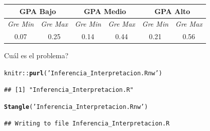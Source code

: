 \documentclass[onesided]{article}\usepackage[]{graphicx}\usepackage[]{color}
\makeatletter
\newcommand{\hlstr}[1]{\textcolor[rgb]{0.192,0.494,0.8}{#1}}%
\newcommand{\hlopt}[1]{\textcolor[rgb]{0,0,0}{#1}}%
\newcommand{\hlstd}[1]{\textcolor[rgb]{0.345,0.345,0.345}{#1}}%
\newcommand{\hlkwd}[1]{\textcolor[rgb]{0.737,0.353,0.396}{\textbf{#1}}}%
\newenvironment{kframe}{%
 \def\at@end@of@kframe{}%
 \ifinner\ifhmode%
  \def\at@end@of@kframe{\end{minipage}}%
  \begin{minipage}{\columnwidth}%
 \fi\fi%
 \def\FrameCommand##1{\hskip\@totalleftmargin \hskip-\fboxsep
 \colorbox{shadecolor}{##1}\hskip-\fboxsep
     \hskip-\linewidth \hskip-\@totalleftmargin \hskip\columnwidth}%
 \MakeFramed {\advance\hsize-\width
   \@totalleftmargin\z@ \linewidth\hsize
   \@setminipage}}%
 {\par\unskip\endMakeFramed%
 \at@end@of@kframe}
\newenvironment{knitrout}{}{} %
\makeatother
\begin{document}
\begin{table}[H]
\begin{tabular}{|c|c|c|c|c|c|}
\hline
\multicolumn{2}{|c|}{\textbf{GPA Bajo}} & \multicolumn{2}{c|}{\textbf{GPA Medio}} & \multicolumn{2}{c|}{\textbf{GPA Alto}} \\ \hline
\textit{Gre Min}   & \textit{Gre Max}   & \textit{Gre Min}   & \textit{Gre Max}   & \textit{Gre Min}   & \textit{Gre Max}  \\ \hline
0.07 & 0.25 &                    
0.14 & 0.44 &                    
0.21 & 0.56 \\ \hline
\end{tabular}
\end{table}


{\color{red}Cu\'al es el problema?}

\begin{knitrout}
\color{fgcolor}\begin{kframe}
\begin{alltt}
\hlstd{knitr}\hlopt{::}\hlkwd{purl}\hlstd{(}\hlstr{'Inferencia_Interpretacion.Rnw'}\hlstd{)}
\end{alltt}
\begin{verbatim}
## [1] "Inferencia_Interpretacion.R"
\end{verbatim}
\begin{alltt}
\hlkwd{Stangle}\hlstd{(}\hlstr{'Inferencia_Interpretacion.Rnw'}\hlstd{)}
\end{alltt}
\begin{verbatim}
## Writing to file Inferencia_Interpretacion.R
\end{verbatim}
\end{kframe}
\end{knitrout}

\end{document}
